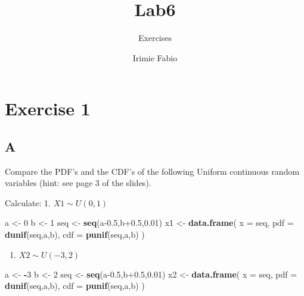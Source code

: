 \documentclass[
]{article}
\title{Lab6}
\subtitle{Exercises}
\author{Irimie Fabio}
\date{}
\newenvironment{Shaded}{\begin{snugshade}}{\end{snugshade}}
\newcommand{\AttributeTok}[1]{\textcolor[rgb]{0.13,0.29,0.53}{#1}}
\newcommand{\DecValTok}[1]{\textcolor[rgb]{0.00,0.00,0.81}{#1}}
\newcommand{\FloatTok}[1]{\textcolor[rgb]{0.00,0.00,0.81}{#1}}
\newcommand{\FunctionTok}[1]{\textcolor[rgb]{0.13,0.29,0.53}{\textbf{#1}}}
\newcommand{\NormalTok}[1]{#1}
\newcommand{\OtherTok}[1]{\textcolor[rgb]{0.56,0.35,0.01}{#1}}
\newcommand{\SpecialCharTok}[1]{\textcolor[rgb]{0.81,0.36,0.00}{\textbf{#1}}}
\providecommand{\tightlist}{%
  \setlength{\itemsep}{0pt}\setlength{\parskip}{0pt}}
\begin{document}
\maketitle

{
\setcounter{tocdepth}{2}
\tableofcontents
}
\hypertarget{exercise-1}{%
\section{Exercise 1}\label{exercise-1}}

\hypertarget{a}{%
\subsection{A}\label{a}}

Compare the PDF's and the CDF's of the following Uniform continuous
random variables (hint: see page 3 of the slides).

Calculate: 1. \(X1 \sim U(0,1)\)

\begin{Shaded}
\begin{Highlighting}[]
\NormalTok{a }\OtherTok{\textless{}{-}} \DecValTok{0}
\NormalTok{b }\OtherTok{\textless{}{-}} \DecValTok{1}
\NormalTok{seq }\OtherTok{\textless{}{-}} \FunctionTok{seq}\NormalTok{(a}\FloatTok{{-}0.5}\NormalTok{,b}\FloatTok{+0.5}\NormalTok{,}\FloatTok{0.01}\NormalTok{)}
\NormalTok{x1 }\OtherTok{\textless{}{-}} \FunctionTok{data.frame}\NormalTok{(}
         \AttributeTok{x =}\NormalTok{ seq,}
         \AttributeTok{pdf =} \FunctionTok{dunif}\NormalTok{(seq,a,b),}
         \AttributeTok{cdf =} \FunctionTok{punif}\NormalTok{(seq,a,b)}
\NormalTok{)}
\end{Highlighting}
\end{Shaded}

\begin{enumerate}
\def\labelenumi{\arabic{enumi}.}
\setcounter{enumi}{1}
\tightlist
\item
  \(X2 \sim U(-3,2)\)
\end{enumerate}

\begin{Shaded}
\begin{Highlighting}[]
\NormalTok{a }\OtherTok{\textless{}{-}} \SpecialCharTok{{-}}\DecValTok{3}
\NormalTok{b }\OtherTok{\textless{}{-}} \DecValTok{2}
\NormalTok{seq }\OtherTok{\textless{}{-}} \FunctionTok{seq}\NormalTok{(a}\FloatTok{{-}0.5}\NormalTok{,b}\FloatTok{+0.5}\NormalTok{,}\FloatTok{0.01}\NormalTok{)}
\NormalTok{x2 }\OtherTok{\textless{}{-}} \FunctionTok{data.frame}\NormalTok{(}
         \AttributeTok{x =}\NormalTok{ seq,}
         \AttributeTok{pdf =} \FunctionTok{dunif}\NormalTok{(seq,a,b),}
         \AttributeTok{cdf =} \FunctionTok{punif}\NormalTok{(seq,a,b)}
\NormalTok{)}
\end{Highlighting}
\end{Shaded}
\end{document}
